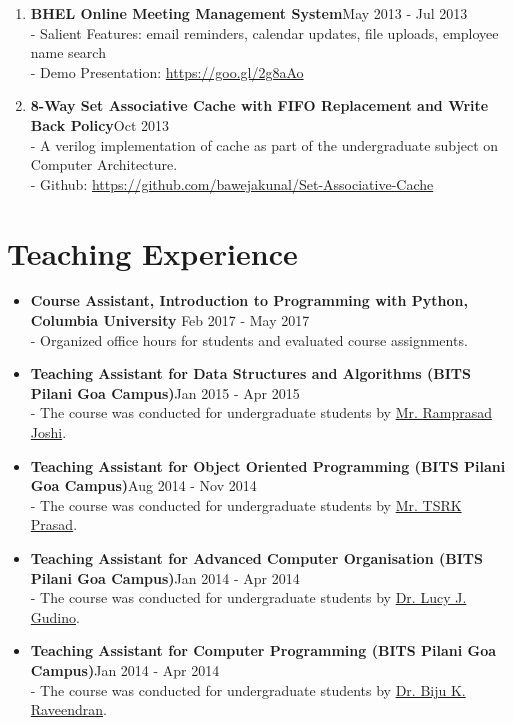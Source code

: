 \documentclass{article}
\begin{document}
\begin{enumerate}
    \item \textbf{BHEL Online Meeting Management System}{\hfill May 2013 - Jul 2013}\\
    - Salient Features: email reminders, calendar updates, file uploads, employee name search\\
    - Demo Presentation: \href{https://goo.gl/2g8aAo}{https://goo.gl/2g8aAo}
    
    \item \textbf{8-Way Set Associative Cache with FIFO Replacement and Write Back Policy}{\hfill Oct 2013}\\
    - A verilog implementation of cache as part of the undergraduate subject on Computer Architecture.\\
    - Github: \href{https://github.com/bawejakunal/Set-Associative-Cache}{https://github.com/bawejakunal/Set-Associative-Cache}
    
\end{enumerate}

\section*{Teaching Experience}
\begin{itemize}
    \item \textbf{Course Assistant, Introduction to Programming with Python, Columbia University} {\hfill Feb 2017 - May 2017}\\
    - Organized office hours for students and evaluated course assignments.

    \item \textbf{Teaching Assistant for Data Structures and Algorithms (BITS Pilani Goa Campus)}{\hfill Jan 2015 - Apr 2015}\\
    - The course was conducted for undergraduate students by \href{http://www.bits-pilani.ac.in/goa/rsj/profile}{Mr. Ramprasad Joshi}.
    
    \item \textbf{Teaching Assistant for Object Oriented Programming (BITS Pilani Goa Campus)}{\hfill Aug 2014 - Nov 2014}\\
    - The course was conducted for undergraduate students by \href{http://universe.bits-pilani.ac.in/goa/tsrkp/Profile}{Mr. TSRK Prasad}.
    
    \item \textbf{Teaching Assistant for Advanced Computer Organisation (BITS Pilani Goa Campus)}{\hfill Jan 2014 - Apr 2014}\\
    - The course was conducted for undergraduate students by \href{http://www.bits-pilani.ac.in/goa/lucy/profile}{Dr. Lucy J. Gudino}.
    
    \item \textbf{Teaching Assistant for Computer Programming (BITS Pilani Goa Campus)}{\hfill Jan 2014 - Apr 2014}\\
    - The course was conducted for undergraduate students by \href{http://universe.bits-pilani.ac.in/goa/biju/profile}{Dr. Biju K. Raveendran}.
\end{itemize}
\end{document}

